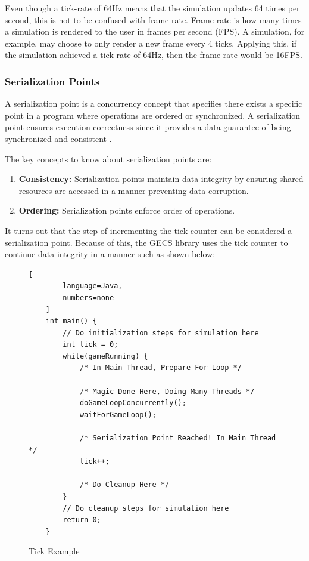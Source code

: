 Even though a tick-rate of 64Hz means that the simulation updates 64 times per second, this is not to be confused with frame-rate. Frame-rate is how many times a simulation is rendered to the user in frames per second (FPS). A simulation, for example, may choose to only render a new frame every 4 ticks. Applying this, if the simulation achieved a tick-rate of 64Hz, then the frame-rate would be 16FPS.

\subsubsection{Serialization Points}
A serialization point is a concurrency concept that specifies there exists a specific point in a program where operations are ordered or synchronized. A serialization point ensures execution correctness since it provides a data guarantee of being synchronized and consistent \cite{Herlihy_2021b}.

The key concepts to know about serialization points are:
\begin{enumerate}
    \item \textbf{Consistency:} Serialization points maintain data integrity by ensuring shared resources are accessed in a manner preventing data corruption.
    \item \textbf{Ordering:} Serialization points enforce order of operations.
\end{enumerate}

It turns out that the step of incrementing the tick counter can be considered a serialization point. Because of this, the GECS library uses the tick counter to continue data integrity in a manner such as shown below:


\begin{figure}[H]
    \begin{lstlisting}[
        language=Java,
        numbers=none
    ]
    int main() {
        // Do initialization steps for simulation here
        int tick = 0;
        while(gameRunning) {
            /* In Main Thread, Prepare For Loop */    

            /* Magic Done Here, Doing Many Threads */
            doGameLoopConcurrently();
            waitForGameLoop();

            /* Serialization Point Reached! In Main Thread */
            tick++;

            /* Do Cleanup Here */
        }
        // Do cleanup steps for simulation here
        return 0;
    }
\end{lstlisting}
    \caption{Tick Example}
    \label{code:naive_ecs_data}
\end{figure}

